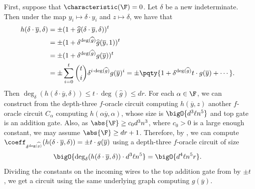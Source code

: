 \documentclass[letterpaper, 11pt]{amsart}
\begin{document}
\begin{pf}
    First, suppose that $\characteristic(\F) = 0$.
    Let $\delta$ be a new indeterminate.
    Then under the map $y_i \mapsto \delta \cdot y_i$ and $z \mapsto \delta$, we have that
    \begin{gather}
    \begin{aligned}\label{eq:pfaff_computation_char_0}
        h(\delta \cdot \overline{y}, \delta) &= \pm (1 + \widehat{g}(\delta \cdot \overline{y}, \delta))^t \\
                                             &= \pm (1 + \delta^{\deg(\widehat{g})} \widehat{g}(\overline{y}, 1))^t \\
                                             &= \pm (1 + \delta^{\deg(\widehat{g})} g(\overline{y}))^t \\
                                             &= \pm \sum_{i = 0}^t \binom{t}{i} \delta^{i \cdot \deg(\widehat{g})} g(\overline{y})^i = \pm \pqty{1 + \delta^{\deg(\widehat{g})} t \cdot g(\overline{y}) + \cdots}.
    \end{aligned}
    \end{gather}
    Then $\deg_\delta(h(\delta \cdot \overline{y}, \delta)) \leq t \cdot \deg(\widehat{g}) \leq dr$.
    For each $\alpha\in\F$, we can construct from the depth-three $f$-oracle circuit computing $h(\overline{y},z)$ another $f$-oracle circuit $C_\alpha$ computing $h(\alpha \overline{y}, \alpha)$, whose size is $\bigO{d^3 \ell n^5}$ and top gate is an addition gate.
    Also, as $\abs{\F} \geq c_0 d^3 n^3$, where $c_0>0$ is a large enough constant, we may assume $\abs{\F} \geq dr+1$.
    Therefore, by , we can compute $\coeff_{\delta^{\deg(\widehat{g})}}(h(\delta\cdot \overline{y},\delta))= \pm t \cdot g(\overline{y})$ using a depth-three $f$-oracle circuit of size 
    \[
        \bigO{\deg_\delta(h(\delta \cdot \overline{y}, \delta))\cdot d^3 \ell n^5} = \bigO{d^4 \ell n^5 r}.
    \]
    Dividing the constants on the incoming wires to the top addition gate from  by $\pm t$, we get a circuit using the same underlying graph computing $g(\overline{y})$.


\end{pf}
\end{document}
